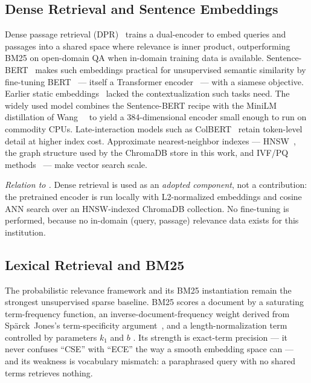 \subsection{Dense Retrieval and Sentence Embeddings}
Dense passage retrieval (DPR)~\cite{karpukhin2020dpr} trains a dual-encoder
to embed queries and passages into a shared space where relevance is inner
product, outperforming BM25 on open-domain QA when in-domain training data
is available. Sentence-BERT~\cite{reimers2019sbert} makes such embeddings
practical for unsupervised semantic similarity by fine-tuning
BERT~\cite{devlin2019bert} --- itself a Transformer
encoder~\cite{vaswani2017attention} --- with a siamese objective. Earlier
static embeddings~\cite{mikolov2013word2vec,pennington2014glove} lacked the
contextualization such tasks need. The widely used 
model combines the Sentence-BERT recipe with the MiniLM distillation of
Wang~\etal~\cite{wang2020minilm} to yield a 384-dimensional encoder small
enough to run on commodity CPUs.
Late-interaction models such as ColBERT~\cite{khattab2020colbert} retain
token-level detail at higher index cost. Approximate nearest-neighbor
indexes --- HNSW~\cite{malkov2020hnsw}, the graph structure used by the
ChromaDB store in this work, and IVF/PQ methods~\cite{johnson2019faiss} ---
make vector search scale.

\emph{Relation to \system{}.} Dense retrieval is used as an
\emph{adopted component}, not a contribution: the pretrained
 encoder is run locally with L2-normalized
embeddings and cosine ANN search over an HNSW-indexed ChromaDB collection.
No fine-tuning is performed, because no in-domain (query, passage) relevance
data exists for this institution.

\subsection{Lexical Retrieval and BM25}
The probabilistic relevance framework and its BM25 instantiation
\cite{robertson1994okapi,robertson2009bm25} remain the strongest
unsupervised sparse baseline. BM25 scores a document by a saturating
term-frequency function, an inverse-document-frequency weight derived from
Sp\"arck~Jones's term-specificity argument~\cite{sparckjones1972idf}, and a
length-normalization term controlled by parameters $k_1$ and $b$
\cite{manning2008ir}. Its strength is exact-term precision --- it never
confuses ``CSE'' with ``ECE'' the way a smooth embedding space can --- and
its weakness is vocabulary mismatch: a paraphrased query with no shared
terms retrieves nothing.

